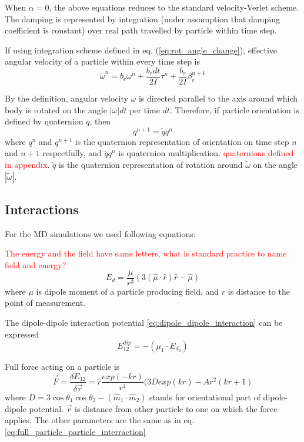 When $\alpha = 0$, the above equations reduces to the standard velocity-Verlet scheme. The damping is represented by integration (under assumption that damping coefficient is constant) over real path travelled by particle within time step.

If using integration scheme defined in eq. (\ref{eq:rot_angle_change}), effective angular velocity of a particle within every time step is
\begin{equation}
\label{eq:effective_angular_velocity}
	\tilde{\omega}^n = b_{r} \omega^n
	+ \frac{b_{r} dt}{2I}\tau^n
	+ \frac{b_{r} }{2I}\beta_{r}^{n+1}
\end{equation}

By the definition, angular velocity $\omega$ is directed parallel to the axis around which body is rotated on the angle $|\omega|dt$ per time $dt$. Therefore, if particle orientation is defined by quaternion $q$, then
\begin{equation}
q^{n+1} = \tilde{q} q^{n}
\end{equation}
where $q^n$ and $q^{n+1}$ is the quaternion representation of orientation on time step $n$ and $n+1$ respectfully, and $\tilde{q} q^{n}$ is quaternion multiplication. \textcolor{red}{quaternions defined in appendix}. $\tilde{q}$ is the quaternion representation of rotation around $\tilde{\omega}$ on the angle $|\tilde{\omega}|$.

\subsection{Interactions}

For the MD simulations we used following equations:

\textcolor{red}{The energy and the field have same letters, what is standard practice to name field and energy?}
\begin{equation}
\label{eq:dipole_field}
	E_d = \frac{\mu}{r^3}
		\left(3 (\hat{\mu} \cdot \hat{r}) \hat{r} - \hat{\mu} \right)
\end{equation}
where $\mu$ is dipole moment of a particle producing field, and $r$ is distance to the point of measurement.

The dipole-dipole interaction potential \eqref{eq:dipole_dipole_interaction} can be expressed
\begin{equation}
\label{eq:dipole_energy_from_potential}
	E^{dip}_{12} = -(\mu_1 \cdot E_{d_2})
\end{equation}

Full force acting on a particle is
\begin{equation}
\label{eq:full_force}
	\vec{F}
		= \frac{\delta E_{12}}{\delta \vec{r}}
		= \hat{r} \frac{exp(-k r)}{r^4}(3 D exp(k r) - A r^2 (k r +1)
\end{equation}
where $D = 3 \cos \theta_1 \cos \theta_2 - (\hat{m}_1 \cdot \hat{m}_2)$ stands for orientational part of dipole-dipole potential. $\vec{r}$ is distance from other particle to one on which the force applies. The other parameters are the same as in eq. \eqref{eq:full_particle_particle_interraction}

